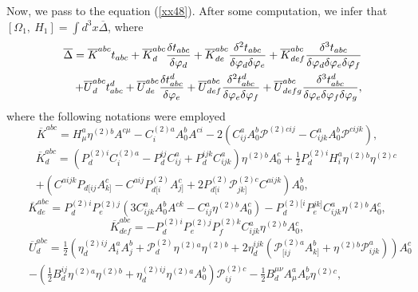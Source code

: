 \documentclass[a4paper,12pt]{article}
\begin{document}
Now, we pass to the equation (\ref{xx48}). After some computation, we infer
that $[\Omega _{1},\ H_{1}]=\int d^{3}x\overline{\Delta }$, where 
\begin{eqnarray}
&&\overline{\Delta }= \overline{K}^{abc}t_{abc}+\overline{K}_{d}^{abc}\frac{%
\delta t_{abc}}{\delta \varphi _{d}}+\overline{K}_{de}^{abc}\frac{\delta
^{2}t_{abc}}{\delta \varphi _{d}\delta \varphi _{e}}+\overline{K}_{def}^{abc}%
\frac{\delta ^{3}t_{abc}}{\delta \varphi _{d}\delta \varphi _{e}\delta
\varphi _{f}}  \nonumber \\
&&+\overline{U}_{d}^{abc}t_{abc}^{d}+\overline{U}_{de}^{abc}\frac{\delta
t_{abc}^{d}}{\delta \varphi _{e}}+\overline{U}_{def}^{abc}\frac{\delta
^{2}t_{abc}^{d}}{\delta \varphi _{e}\delta \varphi _{f}}+\overline{U}%
_{defg}^{abc}\frac{\delta ^{3}t_{abc}^{d}}{\delta \varphi _{e}\delta \varphi
_{f}\delta \varphi _{g}},  \label{xx81}
\end{eqnarray}
where the following notations were employed 
\begin{equation}
\overline{K}^{abc}=H_{\mu }^{a}\eta ^{(2)b}A^{c\mu
}-C_{i}^{(2)a}A_{0}^{b}A^{ci}-2\left( C_{ij}^{a}A_{0}^{b}\mathcal{P}%
^{(2)cij}-C_{ijk}^{a}A_{0}^{b}\mathcal{P}^{cijk}\right) ,  \label{xx82}
\end{equation}
\begin{eqnarray}
&&\overline{K}_{d}^{abc}=\left(
P_{d}^{(2)i}C_{i}^{(2)a}-P_{d}^{ij}C_{ij}^{a}+P_{d}^{ijk}C_{ijk}^{a}\right)
\eta ^{(2)b}A_{0}^{c}+\frac{1}{2}P_{d}^{(2)i}H_{i}^{a}\eta ^{(2)b}\eta
^{(2)c}  \nonumber \\
&&+\left(
C^{aijk}P_{d[ij}A_{k]}^{c}-C^{aij}P_{d[i}^{(2)}A_{j]}^{c}+2P_{d[i}^{(2)}%
\mathcal{P}_{jk]}^{(2)c}C^{aijk}\right) A_{0}^{b},  \label{xx83}
\end{eqnarray}
\begin{equation}
\overline{K}_{de}^{abc}=P_{d}^{(2)i}P_{e}^{(2)j}\left(
3C_{ijk}^{a}A_{0}^{b}A^{ck}-C_{ij}^{a}\eta ^{(2)b}A_{0}^{c}\right)
-P_{d}^{(2)[i}P_{e}^{jk]}C_{ijk}^{a}\eta ^{(2)b}A_{0}^{c},  \label{xx84}
\end{equation}
\begin{equation}
\overline{K}_{def}^{abc}=-P_{d}^{(2)i}P_{e}^{(2)j}P_{f}^{(2)k}C_{ijk}^{a}%
\eta ^{(2)b}A_{0}^{c},  \label{xx85}
\end{equation}
\begin{eqnarray}
&&\overline{U}_{d}^{abc}= \frac{1}{2}\left( \eta
_{d}^{(2)ij}A_{i}^{a}A_{j}^{b}+\mathcal{P}_{d}^{(2)}\eta ^{(2)a}\eta
^{(2)b}+2\eta _{d}^{ijk}\left( \mathcal{P}_{[ij}^{(2)a}A_{k]}^{b}+\eta
^{(2)b}\mathcal{P}_{ijk}^{a}\right) \right) A_{0}^{c}  \nonumber \\
&&-\left( \frac{1}{2}B_{d}^{ij} \eta ^{(2)a}\eta ^{(2)b}+\eta
_{d}^{(2)ij}\eta ^{(2)a}A_{0}^{b}\right) \mathcal{P}_{ij}^{(2)c}-\frac{1}{2}%
B_{d}^{\mu \nu }A_{\mu }^{a}A_{\nu }^{b}\eta ^{(2)c},  \label{xx86}
\end{eqnarray}
\end{document}
